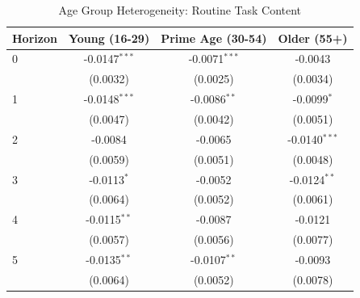 \begin{table}[htbp]
\centering
\caption{Age Group Heterogeneity: Routine Task Content}
\label{tab:age}
\begin{tabular}{lccc}
\hline\hline
Horizon & Young (16-29) & Prime Age (30-54) & Older (55+) \\
\hline
0 & -0.0147$^{***}$ & -0.0071$^{***}$ & -0.0043 \\
 & (0.0032) & (0.0025) & (0.0034) \\[3pt]
1 & -0.0148$^{***}$ & -0.0086$^{**}$ & -0.0099$^{*}$ \\
 & (0.0047) & (0.0042) & (0.0051) \\[3pt]
2 & -0.0084 & -0.0065 & -0.0140$^{***}$ \\
 & (0.0059) & (0.0051) & (0.0048) \\[3pt]
3 & -0.0113$^{*}$ & -0.0052 & -0.0124$^{**}$ \\
 & (0.0064) & (0.0052) & (0.0061) \\[3pt]
4 & -0.0115$^{**}$ & -0.0087 & -0.0121 \\
 & (0.0057) & (0.0056) & (0.0077) \\[3pt]
5 & -0.0135$^{**}$ & -0.0107$^{**}$ & -0.0093 \\
 & (0.0064) & (0.0052) & (0.0078) \\[3pt]
\hline\hline
\end{tabular}
\end{table}